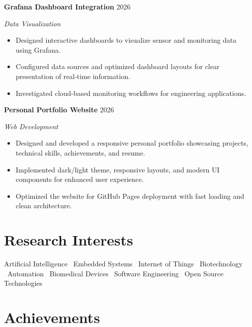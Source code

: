 \documentclass[10pt,a4paper]{article}
\newcommand{\resumeItem}[1]{
\item\small{#1}
}
\newcommand{\resumeProject}[4]{
\textbf{#1}
\hfill
{\small #2}

\textit{#3}

#4

\vspace{6pt}
}
\begin{document}

\resumeProject
{Grafana Dashboard Integration}
{2026}
{Data Visualization}
{
\begin{itemize}[leftmargin=*]

\resumeItem{Designed interactive dashboards to visualize sensor and monitoring data using Grafana.}

\resumeItem{Configured data sources and optimized dashboard layouts for clear presentation of real-time information.}

\resumeItem{Investigated cloud-based monitoring workflows for engineering applications.}

\end{itemize}
}


\resumeProject
{Personal Portfolio Website}
{2026}
{Web Development}
{
\begin{itemize}[leftmargin=*]

\resumeItem{Designed and developed a responsive personal portfolio showcasing projects, technical skills, achievements, and resume.}

\resumeItem{Implemented dark/light theme, responsive layouts, and modern UI components for enhanced user experience.}

\resumeItem{Optimized the website for GitHub Pages deployment with fast loading and clean architecture.}

\end{itemize}
}


\section*{Research Interests}

Artificial Intelligence \textbullet\
Embedded Systems \textbullet\
Internet of Things \textbullet\
Biotechnology \textbullet\
Automation \textbullet\
Biomedical Devices \textbullet\
Software Engineering \textbullet\
Open Source Technologies


\section*{Achievements}
\end{document}
